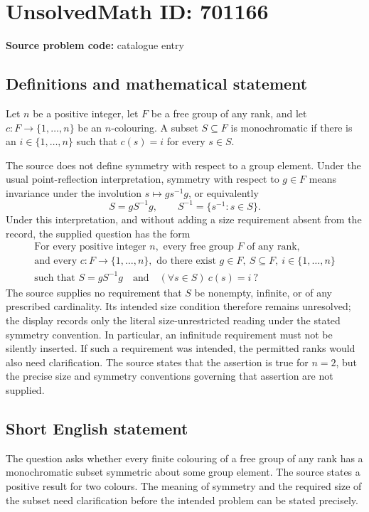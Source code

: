 \documentclass[11pt]{article}
\begin{document}
\section*{UnsolvedMath ID: 701166}
\textbf{Source problem code:} catalogue entry
\subsection{Definitions and mathematical statement}
Let \(n\) be a positive integer, let \(F\) be a free group of any rank, and let \(c:F\to\{1,\ldots,n\}\) be an \(n\)-colouring. A subset \(S\subseteq F\) is monochromatic if there is an \(i\in\{1,\ldots,n\}\) such that \(c(s)=i\) for every \(s\in S\).

The source does not define symmetry with respect to a group element. Under the usual point-reflection interpretation, symmetry with respect to \(g\in F\) means invariance under the involution \(s\mapsto gs^{-1}g\), or equivalently
\[
S=gS^{-1}g,\qquad S^{-1}=\{s^{-1}:s\in S\}.
\]
Under this interpretation, and without adding a size requirement absent from the record, the supplied question has the form
\[
\begin{gathered}
\text{For every positive integer }n,\text{ every free group }F\text{ of any rank,}\\
\text{and every }c:F\to\{1,\ldots,n\},\text{ do there exist }g\in F,\ S\subseteq F,\ i\in\{1,\ldots,n\}\\
\text{such that }S=gS^{-1}g\quad\text{and}\quad (\forall s\in S)\ c(s)=i\ ?
\end{gathered}
\]
The source supplies no requirement that \(S\) be nonempty, infinite, or of any prescribed cardinality. Its intended size condition therefore remains unresolved; the display records only the literal size-unrestricted reading under the stated symmetry convention. In particular, an infinitude requirement must not be silently inserted. If such a requirement was intended, the permitted ranks would also need clarification. The source states that the assertion is true for \(n=2\), but the precise size and symmetry conventions governing that assertion are not supplied.
\subsection{Short English statement}
The question asks whether every finite colouring of a free group of any rank has a monochromatic subset symmetric about some group element. The source states a positive result for two colours. The meaning of symmetry and the required size of the subset need clarification before the intended problem can be stated precisely.
\end{document}
